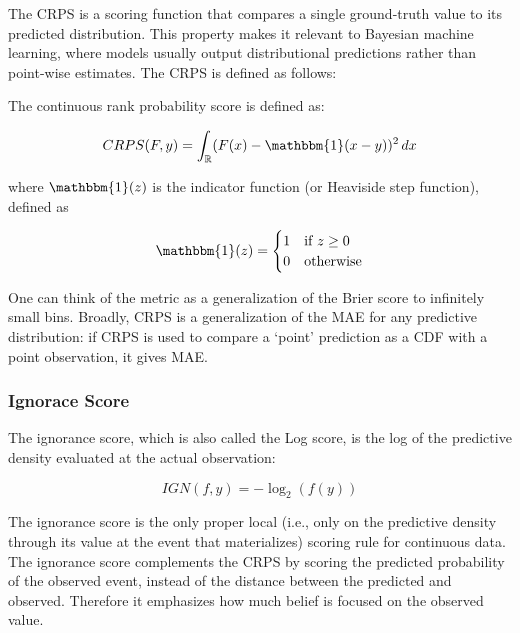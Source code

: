 \documentclass[runningheads]{llncs}
\begin{document}
    The CRPS is a scoring function that compares a single ground-truth value to its predicted distribution. This property makes it relevant to Bayesian machine learning, where models usually output distributional predictions rather than point-wise estimates. The CRPS is defined as follows:

    The continuous rank probability score is defined as:


    \begin{equation}
        CRPS(F,y) = \int_{\mathbb{R}} (F(x) - \mathbbm{1}(x - y))^2 \, dx
    \end{equation}

    where \(\mathbbm{1}(z)\) is the indicator function (or Heaviside step function), defined as

    \begin{equation}
        \mathbbm{1}(z) =
        \begin{cases}
            1 & \text{if } z \geq 0 \\
            0 & \text{otherwise}
        \end{cases}
    \end{equation}




    One can think of the metric as a generalization of the Brier score to infinitely small bins. Broadly, CRPS is a generalization of the MAE for any predictive distribution: if CRPS is used to compare a ‘point’ prediction as a CDF with a point observation, it gives MAE.

    \subsubsection{Ignorace Score}

    The ignorance score, which is also called the Log score, is the log of the predictive density evaluated at the actual observation:

    \begin{equation}
        IGN(f, y) = -\log_2(f(y))
    \end{equation}

    The ignorance score is the only proper local (i.e., only on the predictive density through its value at the event that materializes) scoring rule for continuous data. The ignorance score complements the CRPS by scoring the predicted probability of the observed event, instead of the distance between the predicted and observed. Therefore it emphasizes how much belief is focused on the observed value.
\end{document}
